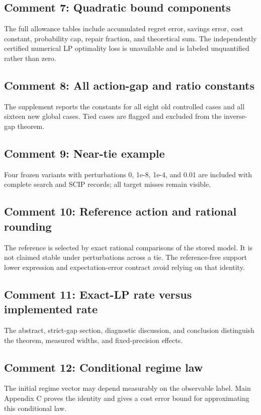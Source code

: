\subsection{Comment 7: Quadratic bound components}
The full allowance tables include accumulated regret error, savings error, cost constant, probability cap, repair fraction, and theoretical sum. The independently certified numerical LP optimality loss is unavailable and is labeled unquantified rather than zero.

\subsection{Comment 8: All action-gap and ratio constants}
The supplement reports the constants for all eight old controlled cases and all sixteen new global cases. Tied cases are flagged and excluded from the inverse-gap theorem.

\subsection{Comment 9: Near-tie example}
Four frozen variants with perturbations 0, 1e-8, 1e-4, and 0.01 are included with complete search and SCIP records; all target misses remain visible.

\subsection{Comment 10: Reference action and rational rounding}
The reference is selected by exact rational comparisons of the stored model. It is not claimed stable under perturbations across a tie. The reference-free support lower expression and expectation-error contract avoid relying on that identity.

\subsection{Comment 11: Exact-LP rate versus implemented rate}
The abstract, strict-gap section, diagnostic discussion, and conclusion distinguish the theorem, measured widths, and fixed-precision effects.

\subsection{Comment 12: Conditional regime law}
The initial regime vector may depend measurably on the observable label. Main Appendix C proves the identity and gives a cost error bound for approximating this conditional law.

